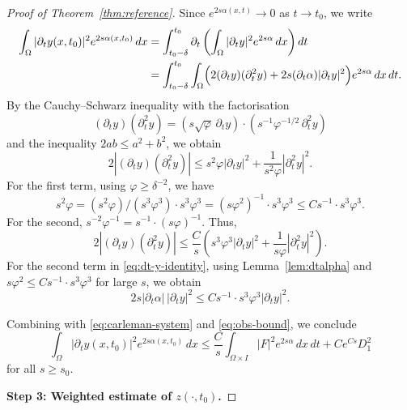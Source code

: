 \documentclass[10pt,a4paper]{amsart}
\newcommand{\Om}{\Omega}
\newcommand{\p}{\partial}
\begin{document}
\begin{proof}[Proof of Theorem~\ref{thm:reference}]
Since $e^{2s\alpha(x,t)}\to0 $ as $ t\to t_0$, we write
\begin{align}
\int_\Om |\p_t y(x,t_0)|^2 e^{2s\alpha(x,t_0)}\,dx
&=\int_{t_0-\delta}^{t_0}\p_t\left(
\int_\Om |\p_t y|^2 e^{2s\alpha}\,dx\right)dt \notag\\
&=\int_{t_0-\delta}^{t_0}\int_\Om
\Bigl(2(\p_t y)(\p_t^2 y)+2s(\p_t\alpha)|\p_t y|^2\Bigr)
e^{2s\alpha}\,dx\,dt.
\label{eq:dt-y-identity}
\end{align}
By the Cauchy--Schwarz inequality with the factorisation
$$(\p_t y)(\p_t^2 y)=
(s\sqrt\varphi\,\p_t y)\cdot(s^{-1}\varphi^{-1/2}\,\p_t^2 y)$$
and the inequality $2ab\le a^2+b^2$, we obtain
\begin{equation}\label{eq:young-dty}
2|(\p_t y)(\p_t^2 y)|
\le s^2\varphi|\p_t y|^2+\frac{1}{s^2\varphi}|\p_t^2 y|^2.
\end{equation}
For the first term, using $\varphi\ge\delta^{-2}$, we have
$$s^2\varphi = (s^2\varphi)/(s^3\varphi^3)\cdot s^3\varphi^3
= (s\varphi^2)^{-1}\cdot s^3\varphi^3
\le C s^{-1}\cdot s^3\varphi^3.$$
For the second,
$s^{-2}\varphi^{-1}=s^{-1}\cdot(s\varphi)^{-1}$.
Thus,
\begin{equation}\label{eq:young-dty-final}
2|(\p_t y)(\p_t^2 y)|
\le \frac{C}{s}\left(s^3\varphi^3|\p_t y|^2
+\frac{1}{s\varphi}|\p_t^2 y|^2\right).
\end{equation}
For the second term in \eqref{eq:dt-y-identity}, using
Lemma~\ref{lem:dtalpha} and
$s\varphi^2\le Cs^{-1}\cdot s^3\varphi^3$ for large $s$, we obtain
$$2s|\p_t\alpha|\,|\p_t y|^2\le Cs^{-1}\cdot s^3\varphi^3|\p_t y|^2.$$

Combining with \eqref{eq:carleman-system} and \eqref{eq:obs-bound}, we
conclude
\begin{equation}\label{eq:dt-y-final}
\int_\Om |\p_t y(x,t_0)|^2 e^{2s\alpha(x,t_0)}\,dx
\le \frac{C}{s}\int_{\Om\times I}|F|^2 e^{2s\alpha}\,dx\,dt
+ C e^{Cs} D_1^2
\end{equation}
for all $s\ge s_0$.

\medskip
\noindent\textbf{Step 3: Weighted estimate of $z(\cdot,t_0)$.}


\end{proof}
\end{document}
